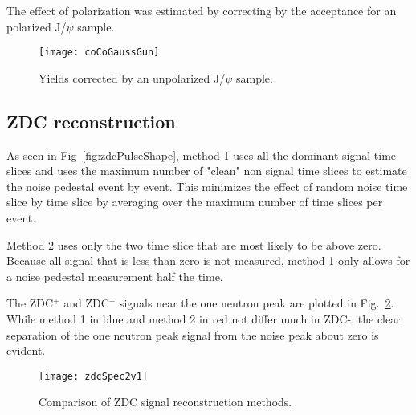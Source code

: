       The effect of polarization was estimated by correcting by the acceptance
        for an polarized J/$\psi$ sample.
      \begin{figure}[!Hhtb]
        \centering
        \texttt{[image: coCoGaussGun]}
        \caption{Yields corrected by an unpolarized J/$\psi$ sample.}
        \label{fig:coYieldGaussCor}
      \end{figure}

    \subsection{ZDC reconstruction}
       As seen in Fig~\ref{fig:zdcPulseShape}, method 1 uses all the dominant 
        signal time slices and uses the maximum number of "clean" non signal 
        time slices to estimate the noise pedestal event by event.
      This minimizes the effect of random noise time slice by time slice by 
        averaging over the maximum number of time slices per event. 

      Method 2 uses only the two time slice that are most likely to be above 
        zero. 
      Because all signal that is less than zero is not measured, method 1 
        only allows for a noise pedestal measurement half the time.

      The ZDC$^{+}$ and ZDC$^{-}$ signals near the one neutron peak are 
        plotted in Fig.~\ref{fig:zdcSpec2v1}.
      While method 1 in blue and method 2 in red not differ much in ZDC-, 
        the clear separation of the one neutron peak signal from the noise 
        peak about zero is evident. 
      \begin{figure}[h]
        \centering
        \texttt{[image: zdcSpec2v1]}
        \caption{Comparison of ZDC signal reconstruction methods.}
        \label{fig:zdcSpec2v1}
      \end{figure}

